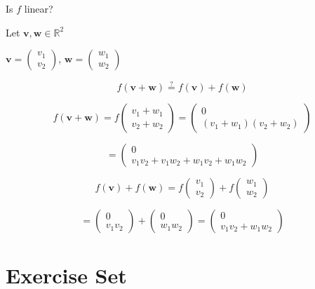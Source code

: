 \documentclass[a4paper, 12pt]{article}
\begin{document}
Is $f$ linear?

Let $\mathbf{v}, \mathbf{w} \in \mathbb{R}^2$

$\mathbf{v} = \left( \begin{array}{c}
v_1 \\
v_2
\end{array} \right)$, $\mathbf{w} = \left( \begin{array}{c}
w_1 \\
w_2
\end{array} \right)$

\[
f(\mathbf{v} + \mathbf{w}) \stackrel{?}{=} f(\mathbf{v}) + f(\mathbf{w})
\]

\[
f(\mathbf{v} + \mathbf{w}) = f\left( \begin{array}{c}
v_1 + w_1 \\
v_2 + w_2
\end{array} \right) = \left( \begin{array}{c}
0 \\
(v_1 + w_1)(v_2 + w_2)
\end{array} \right)
\]

\[
= \left( \begin{array}{c}
0 \\
v_1v_2 + v_1w_2 + w_1v_2 + w_1w_2
\end{array} \right)
\]

\[
f(\mathbf{v}) + f(\mathbf{w}) = f\left( \begin{array}{c}
v_1 \\
v_2
\end{array} \right) + f\left( \begin{array}{c}
w_1 \\
w_2
\end{array} \right)
\]

\[
= \left( \begin{array}{c}
0 \\
v_1v_2
\end{array} \right) + \left( \begin{array}{c}
0 \\
w_1w_2
\end{array} \right) = \left( \begin{array}{c}
0 \\
v_1v_2 + w_1w_2
\end{array} \right)
\]

\section{Exercise Set}
\end{document}
